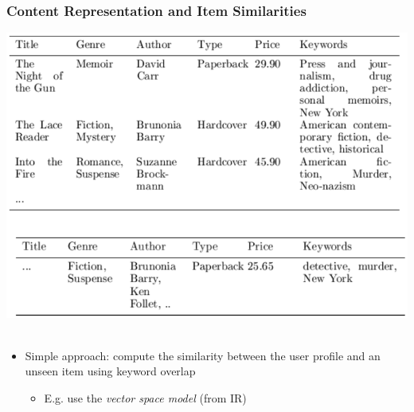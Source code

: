 \documentclass{beamer}
\begin{document}
\begin{frame}
    \frametitle{Content Representation and Item Similarities}
    \hfill\includegraphics[width=.8\linewidth]{content}\hfill~ \\
    \begin{itemize}
    \item {Simple approach:} compute the similarity between the user profile
        and an unseen item using keyword overlap
        \begin{itemize}
        \item E.g. use the \emph{vector space model} (from IR)
        \end{itemize}
    \end{itemize}
\end{frame}
\end{document}

